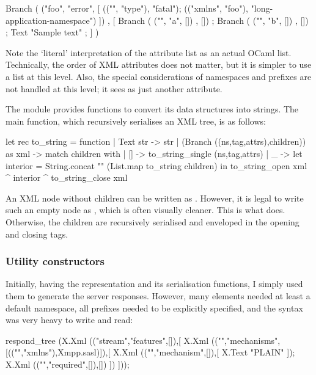 \documentclass[12pt,a4paper,twoside,openright]{report}
\begin{document}
{\begin{ocaml}
Branch ( ("foo", "error", [
    (("", "type"), "fatal");
    (("xmlns", "foo"), "long-application-namespace")
  ]) , [
    Branch ( ("", "a", []) , []) ;
    Branch ( ("", "b", []) , []) ;
    Text "Sample text" ;
] )
\end{ocaml}

Note the `literal' interpretation of the attribute list as an actual OCaml list. Technically, the order of XML attributes does not matter, but it is simpler to use a list at this level. Also, the special considerations of namespaces and prefixes are not handled at this level; it sees  as just another attribute.

The  module provides functions to convert its data structures into strings. The main  function, which recursively serialises an XML tree, is as follows:

\begin{ocaml}
let rec to_string = function
  | Text str -> str
  | (Branch ((ns,tag,attrs),children)) as xml ->
    match children with
    | [] -> to_string_single (ns,tag,attrs)
    | _  -> let interior = String.concat "" (List.map to_string children) in
            to_string_open xml ^ interior ^ to_string_close xml
\end{ocaml}

An XML node without children can be written as . However, it is legal to write such an empty node as , which is often visually cleaner. This is what  does. Otherwise, the children are recursively serialised and enveloped in the opening and closing tags.

\subsubsection{Utility constructors}
Initially, having the  representation and its serialisation functions, I simply used them to generate the server responses. However, many elements needed at least a default namespace, all prefixes needed to be explicitly specified, and the syntax was very heavy to write and read:

\begin{ocaml}
respond_tree
  (X.Xml (("stream","features",[]),[
    X.Xml (("","mechanisms",[(("","xmlns"),Xmpp.sasl)]),[
        X.Xml (("","mechanism",[]),[ X.Text "PLAIN" ]);
        X.Xml (("","required",[]),[])
      ])
  ]));
\end{ocaml}

}
\end{document}
